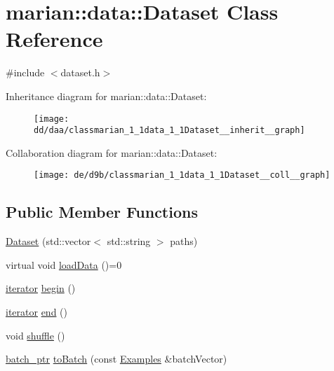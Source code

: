 \hypertarget{classmarian_1_1data_1_1Dataset}{}\section{marian\+:\+:data\+:\+:Dataset Class Reference}
\label{classmarian_1_1data_1_1Dataset}


{\ttfamily \#include $<$dataset.\+h$>$}



Inheritance diagram for marian\+:\+:data\+:\+:Dataset\+:
\nopagebreak
\begin{figure}[H]
\begin{center}
\leavevmode
\texttt{[image: dd/daa/classmarian\_1\_1data\_1\_1Dataset\_\_inherit\_\_graph]}
\end{center}
\end{figure}


Collaboration diagram for marian\+:\+:data\+:\+:Dataset\+:
\nopagebreak
\begin{figure}[H]
\begin{center}
\leavevmode
\texttt{[image: de/d9b/classmarian\_1\_1data\_1\_1Dataset\_\_coll\_\_graph]}
\end{center}
\end{figure}
\subsection*{Public Member Functions}
\begin{DoxyCompactItemize}
\item 
\hyperlink{classmarian_1_1data_1_1Dataset_a6db460dbb984620b13700ac6069f9925}{Dataset} (std\+::vector$<$ std\+::string $>$ paths)
\item 
virtual void \hyperlink{classmarian_1_1data_1_1Dataset_ae999d10fb3509203d694639582e438a6}{load\+Data} ()=0
\item 
\hyperlink{classmarian_1_1data_1_1DatasetBase_a5ab99390e2f5f8c7eab612977ae64f38}{iterator} \hyperlink{classmarian_1_1data_1_1Dataset_ad2cd49a5cd8a999e9d33bb1e0147f03e}{begin} ()
\item 
\hyperlink{classmarian_1_1data_1_1DatasetBase_a5ab99390e2f5f8c7eab612977ae64f38}{iterator} \hyperlink{classmarian_1_1data_1_1Dataset_a123311e204818aeee4d5e4011e1b79fe}{end} ()
\item 
void \hyperlink{classmarian_1_1data_1_1Dataset_abaaf65b7a716604071b8756dd11e8391}{shuffle} ()
\item 
\hyperlink{classmarian_1_1data_1_1DatasetBase_a4cb5e9051a072fcc61ed4638862f01f5}{batch\+\_\+ptr} \hyperlink{classmarian_1_1data_1_1Dataset_a27ff57e73e81b555305a5f45cde30d91}{to\+Batch} (const \hyperlink{namespacemarian_1_1data_a39201a9c7e3f08ea31141ec770b60868}{Examples} \&batch\+Vector)
\end{DoxyCompactItemize}
